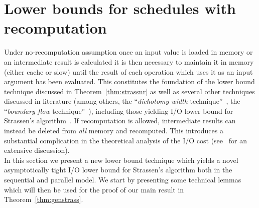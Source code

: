\documentclass[a4paper,UKenglish]{lipics-v2016}
\newcommand{\io }{I/O }
\begin{document}
\section{Lower bounds for schedules with recomputation}\label{sec:stragen}
Under no-recomputation assumption once an input value is loaded in memory or an intermediate result is calculated it is then necessary to maintain it in memory (either cache or slow) until the result of each operation which uses it as an input argument has been evaluated. This constitutes the foundation of the lower bound technique discussed in Theorem~\ref{thm:strassnr} as well as several other techniques discussed in literature (among others, the ``\emph{dichotomy width} technique''~\cite{bilardi1999processor}, the ``\emph{boundary flow} technique''~\cite{ranjan2012upper}), including those yielding \io lower bound for Strassen's algorithm~\cite{ballard2012graphrec,scott2015matrix}. If recomputation is allowed, intermediate results can instead be deleted from \emph{all} memory and recomputed. This introduces a substantial complication in the theoretical analysis of the \io cost (see~\cite{ballard2011minimizing} for an extensive discussion). \\

In this section we present a new lower bound technique which yields a novel asymptotically tight \io lower bound for Strassen's algorithm both in the sequential and parallel model.
We start by presenting some technical lemmas which  will then be used for the proof of our main result in Theorem~\ref{thm:genstrass}. 
\end{document}
